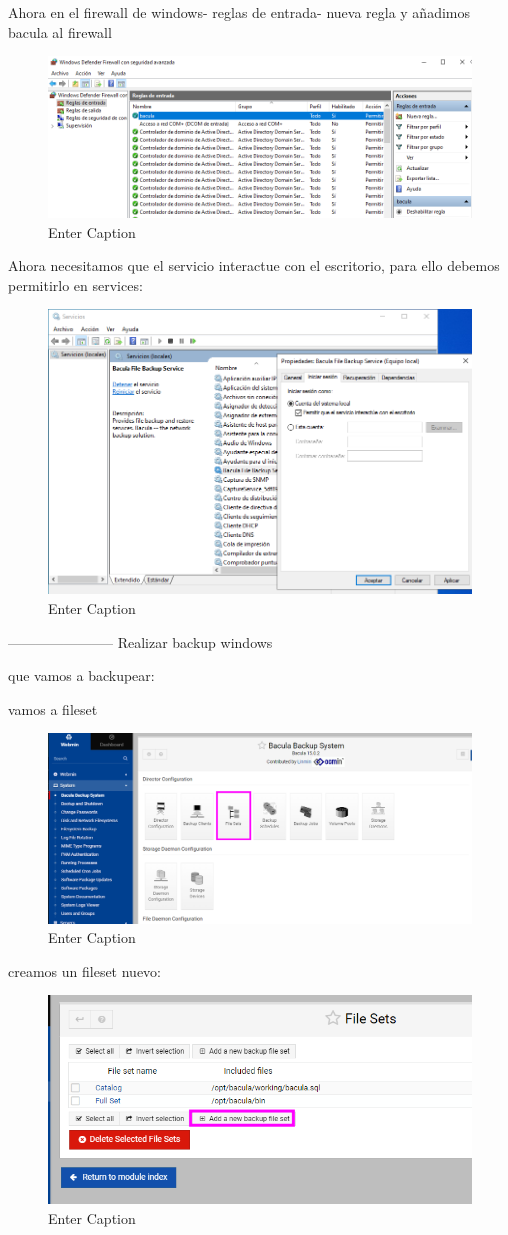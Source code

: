 Ahora en el firewall de windows- reglas de entrada- nueva regla
y añadimos bacula al firewall

\begin{figure}[H]
    \centering
    \includegraphics[width=0.5\linewidth]{instalacionBacula/firewallwindows.png}
    \caption{Enter Caption}
\end{figure}

Ahora necesitamos que el servicio interactue con el escritorio, para ello debemos permitirlo en services:

\begin{figure}
    \centering
    \includegraphics[width=0.5\linewidth]{instalacionBacula/permitirservicio.png}
    \caption{Enter Caption}
\end{figure}

-----------------------
Realizar backup windows

que vamos a backupear:

vamos a fileset
\begin{figure}[H]
    \centering
    \includegraphics[width=0.5\linewidth]{instalacionBacula/filesetwebmin.png}
    \caption{Enter Caption}
\end{figure}


creamos un fileset nuevo:

\begin{figure}[H]
    \centering
    \includegraphics[width=0.5\linewidth]{instalacionBacula/cpropiofileset.png}
    \caption{Enter Caption}
\end{figure}

